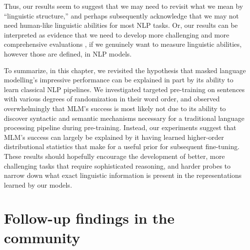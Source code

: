 \documentclass[letterpaper, 12pt]{report}
\begin{document}
Thus, our results seem to suggest that we may need to revisit what we mean by ``linguistic structure,'' and perhaps subsequently acknowledge that we may not need human-like linguistic abilities for most NLP tasks. Or, our results can be interpreted as evidence that we need to develop more challenging and more comprehensive evaluations%
, if we genuinely want to measure linguistic abilities, however those are defined, in NLP models.


To summarize, in this chapter, we revisited the hypothesis that masked language modelling's impressive performance can be explained in part by its ability to learn classical NLP pipelines. We investigated targeted pre-training on sentences with various degrees of randomization in their word order, and observed overwhelmingly that MLM's success is most likely not due to its ability to discover syntactic and semantic mechanisms necessary for a traditional language processing pipeline during pre-training. Instead, our experiments suggest that MLM's success can largely be explained by it having learned higher-order distributional statistics that make for a useful prior for subsequent fine-tuning. These results should hopefully encourage the development of better, more challenging tasks that require sophisticated reasoning, and harder probes to narrow down what exact linguistic information is present in the representations learned by our models.
%


\section{Follow-up findings in the community}
\label{sec:mlm_followup}
\end{document}
